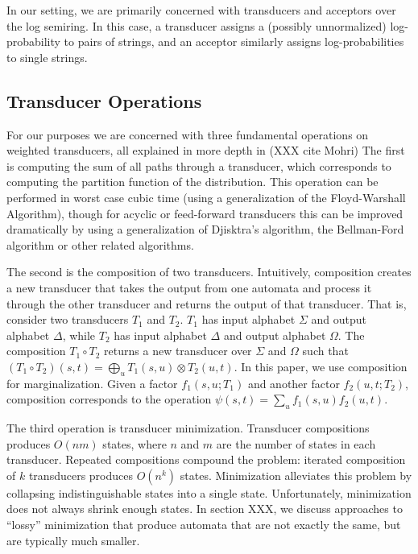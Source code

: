 \documentclass[11pt,a4paper]{article}
\begin{document}
In our setting, we are primarily concerned with transducers and
acceptors over the log semiring. In this case, a transducer assigns
a (possibly unnormalized) log-probability to pairs of strings, and
an acceptor similarly assigns log-probabilities to single strings.

\subsection{Transducer Operations}

For our purposes we are concerned with three fundamental operations
on weighted transducers, all explained in more depth in (XXX cite
Mohri) The first is computing the sum of all paths through a
transducer, which corresponds to computing the partition function
of the distribution. This operation can be performed in worst case
cubic time (using a generalization of the Floyd-Warshall Algorithm),
though for acyclic or feed-forward transducers this can be improved
dramatically by using a generalization of Djisktra's algorithm, the
Bellman-Ford algorithm or other related algorithms.

The second is the composition of two transducers. Intuitively,
composition creates a new transducer that takes the output from one
automata and process it through the other transducer and returns
the output of that transducer. That is, consider two transducers
$T_1$ and $T_2$. $T_1$ has input alphabet $\Sigma$ and output
alphabet $\Delta$, while $T_2$ has input alphabet $\Delta$ and
output alphabet $\Omega$. The composition $T_1 \circ T_2$ returns
a new transducer over $\Sigma$ and $\Omega$ such that $(T_1 \circ
T_2)(s,t) = \bigoplus_{u} T_1(s,u)\otimes T_2(u,t)$. In this paper,
we use composition for marginalization. Given a factor $f_1(s,u;T_1)$
and another factor $f_2(u,t;T_2)$, composition corresponds to the
operation $\psi(s,t) = \sum_u f_1(s,u) f_2(u,t)$.

The third operation is transducer minimization. Transducer compositions
produces $O(nm)$ states, where $n$ and $m$ are the number of states
in each transducer. Repeated compositions compound the problem:
iterated composition of $k$ transducers produces $O(n^k)$ states.
Minimization alleviates this problem by collapsing indistinguishable
states into a single state.  Unfortunately, minimization does not
always shrink enough states. In section XXX, we discuss approaches
to ``lossy'' minimization that produce automata that are not exactly
the same, but are typically much smaller.
\end{document}
